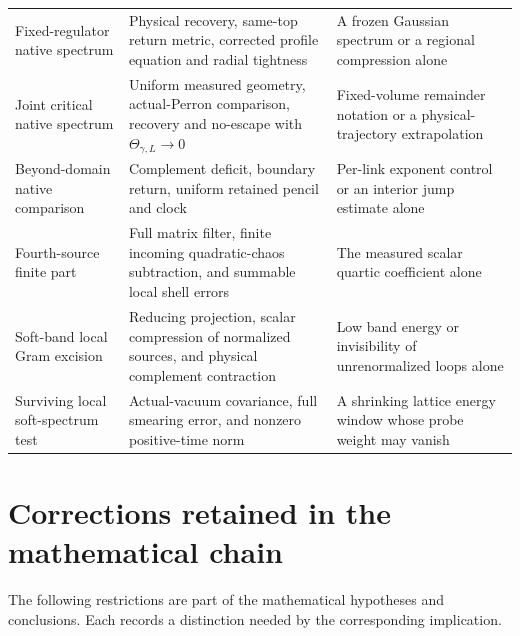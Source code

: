 \documentclass[11pt,oneside,openany]{book}
\theoremstyle{definition}
\theoremstyle{remark}
\begin{document}
\begin{longtable}{L{0.27\textwidth}L{0.34\textwidth}L{0.29\textwidth}}
Fixed-regulator native spectrum & Physical recovery, same-top return metric, corrected profile equation and radial tightness & A frozen Gaussian spectrum or a regional compression alone \\
Joint critical native spectrum & Uniform measured geometry, actual-Perron comparison, recovery and no-escape with $\Theta_{\gamma,L}\to0$ & Fixed-volume remainder notation or a physical-trajectory extrapolation \\
Beyond-domain native comparison & Complement deficit, boundary return, uniform retained pencil and clock & Per-link exponent control or an interior jump estimate alone \\
Fourth-source finite part & Full matrix filter, finite incoming quadratic-chaos subtraction, and summable local shell errors & The measured scalar quartic coefficient alone \\
Soft-band local Gram excision & Reducing projection, scalar compression of normalized sources, and physical complement contraction & Low band energy or invisibility of unrenormalized loops alone \\
Surviving local soft-spectrum test & Actual-vacuum covariance, full smearing error, and nonzero positive-time norm & A shrinking lattice energy window whose probe weight may vanish \\
\bottomrule
\end{longtable}

\chapter{Corrections retained in the mathematical chain}
\label{app:corrections}
The following restrictions are part of the mathematical hypotheses and conclusions. Each records a distinction needed by the corresponding implication.
\end{document}
